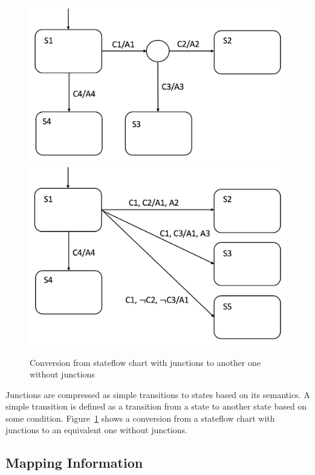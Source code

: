 \documentclass{article}
\begin{document}
\begin{figure}[h]
\begin{center}
  \includegraphics[scale=0.22]{figures/sf1} 
    \includegraphics[scale=0.2]{figures/sf2}    
\end{center}  
  \caption{Conversion from stateflow chart with junctions to another one without junctions}
  \label{sf1}
\end{figure}

Junctions are compressed as simple transitions to states based on its semantics. 
A simple transition is defined as a transition from a state to another state based on some condition. 
Figure~\ref{sf1} shows a conversion from a stateflow chart with junctions to an equivalent one without junctions.



\subsection{Mapping Information}
\end{document}
